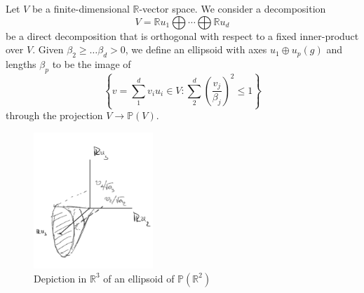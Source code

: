 \documentclass{report}
\begin{document}
\begin{definition}
    Let $V$ be a finite-dimensional $\mathbb R$-vector space.
    We consider a decomposition
    \[
        V = \mathbb R u_1 \bigoplus \cdots \bigoplus \mathbb R u_d
    \] 
    be a direct decomposition that is orthogonal with respect to a fixed inner-product over $V$.
    Given $\beta_2 \geq \ldots \beta_d > 0$, we define an ellipsoid with axes $u_1 \oplus u_p(g)$ and lengths $\beta_p$ to be the image of
    \[
        \left\{
            v = \sum_1^d v_i u_i\in V : \sum_2^d \left( \frac{v_j}{\beta_j} \right)^2 \leq 1
        \right\}
    \]
    through the projection $ V \to \mathbb P (V)$.
\end{definition}
\begin{figure}[h]
    \centering
    \includegraphics[width=0.4\textwidth]{ellipsoid.jpg}
    \caption{Depiction in $\mathbb R^3$ of an ellipsoid of $\mathbb P(\mathbb R^2)$}
    \label{fig:ellipsoid}
\end{figure}    
\end{document}
